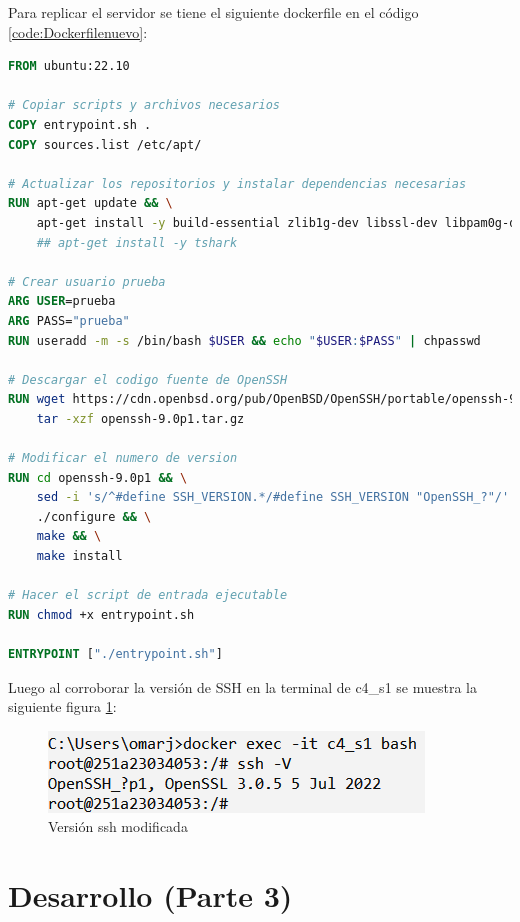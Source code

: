 \documentclass[letter,12pt]{article}
\newcounter{codecount}
\begin{document}
Para replicar el servidor se tiene el siguiente dockerfile en el código \ref{code:Dockerfilenuevo}:


\label{code:Dockerfilenuevo}
\begin{lstlisting}[language=Dockerfile, caption={Dockerfile nuevo para c4\_s1}]
FROM ubuntu:22.10

# Copiar scripts y archivos necesarios
COPY entrypoint.sh .
COPY sources.list /etc/apt/

# Actualizar los repositorios y instalar dependencias necesarias
RUN apt-get update && \
    apt-get install -y build-essential zlib1g-dev libssl-dev libpam0g-dev libselinux1-dev wget  
    ## apt-get install -y tshark

# Crear usuario prueba
ARG USER=prueba
ARG PASS="prueba"
RUN useradd -m -s /bin/bash $USER && echo "$USER:$PASS" | chpasswd

# Descargar el codigo fuente de OpenSSH
RUN wget https://cdn.openbsd.org/pub/OpenBSD/OpenSSH/portable/openssh-9.0p1.tar.gz && \
    tar -xzf openssh-9.0p1.tar.gz

# Modificar el numero de version
RUN cd openssh-9.0p1 && \
    sed -i 's/^#define SSH_VERSION.*/#define SSH_VERSION "OpenSSH_?"/' version.h && \
    ./configure && \
    make && \
    make install

# Hacer el script de entrada ejecutable
RUN chmod +x entrypoint.sh

ENTRYPOINT ["./entrypoint.sh"]

\end{lstlisting}


Luego al corroborar la versión de SSH en la terminal de c4\_s1 se muestra la siguiente figura \ref{fig:sshversion}:

\begin{figure}[ht]
    \centering
    \includegraphics[width=0.6\linewidth]{Images/parte2/sshversion.png}
    \caption{Versión ssh modificada}
    \label{fig:sshversion}
\end{figure}



\clearpage

\section{Desarrollo (Parte 3)}
\end{document}
